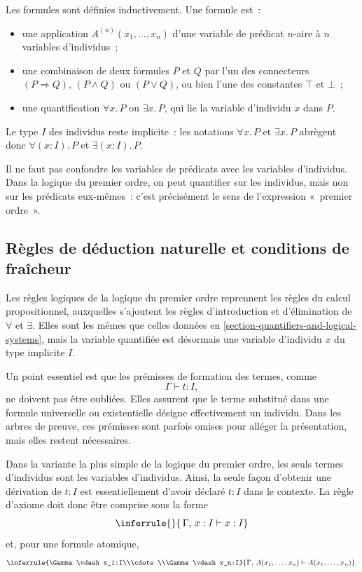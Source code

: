 \thingy
Les formules sont définies inductivement.  Une formule est :
\begin{itemize}
\item une application $A^{(n)}(x_1,\ldots,x_n)$ d'une variable de
  prédicat $n$-aire à $n$ variables d'individus ;
\item une combinaison de deux formules $P$ et $Q$ par l'un des
  connecteurs $(P\Rightarrow Q)$, $(P\land Q)$ ou $(P\lor Q)$, ou bien
  l'une des constantes $\top$ et $\bot$ ;
\item une quantification $\forall x.\,P$ ou $\exists x.\,P$, qui lie la
  variable d'individu $x$ dans $P$.
\end{itemize}
Le type $I$ des individus reste implicite : les notations
$\forall x.\,P$ et $\exists x.\,P$ abrègent donc
$\forall(x:I).\,P$ et $\exists(x:I).\,P$.

\thingy
Il ne faut pas confondre les variables de prédicats avec les variables
d'individus.  Dans la logique du premier ordre, on peut quantifier sur
les individus, mais non sur les prédicats eux-mêmes : c'est précisément
le sens de l'expression « premier ordre ».

\subsection{Règles de déduction naturelle et conditions de fraîcheur}

\thingy
Les règles logiques de la logique du premier ordre reprennent les règles
du calcul propositionnel, auxquelles s'ajoutent les règles
d'introduction et d'élimination de $\forall$ et $\exists$.  Elles sont
les mêmes que celles données en
\ref{section-quantifiers-and-logical-systems}, mais la variable
quantifiée est désormais une variable d'individu $x$ du type implicite
$I$.


\thingy
Un point essentiel est que les prémisses de formation des termes,
comme
\[
\Gamma\vdash t:I,
\]
ne doivent pas être oubliées.  Elles assurent que le terme substitué
dans une formule universelle ou existentielle désigne effectivement un
individu.  Dans les arbres de preuve, ces prémisses sont parfois
omises pour alléger la présentation, mais elles restent nécessaires.

\thingy
Dans la variante la plus simple de la logique du premier ordre, les
seuls termes d'individus sont les variables d'individus.  Ainsi, la
seule façon d'obtenir une dérivation de $t:I$ est essentiellement
d'avoir déclaré $t:I$ dans le contexte.  La règle d'axiome doit donc
être comprise sous la forme
\[
\inferrule{}{\,\Gamma,\,x:I\vdash x:I}
\]
et, pour une formule atomique,
\[
\inferrule
  {\Gamma\vdash x_1:I\\\cdots\\\Gamma\vdash x_n:I}
  {\Gamma,\,A(x_1,\ldots,x_n)\vdash A(x_1,\ldots,x_n)}.
\]

